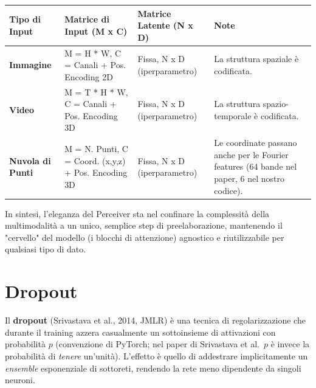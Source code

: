 \documentclass[
  11pt,
]{article}
\newcounter{none} %
\begin{document}
{\def\LTcaptype{none} %
\begin{longtable}{@{}
  >{\raggedright\arraybackslash}p{}
  >{\raggedright\arraybackslash}p{}
  >{\raggedright\arraybackslash}p{}
  >{\raggedright\arraybackslash}p{}@{}}
\toprule\noalign{}
\begin{minipage}[b]{\linewidth}\raggedright
Tipo di Input
\end{minipage} & \begin{minipage}[b]{\linewidth}\raggedright
Matrice di Input (M x C)
\end{minipage} & \begin{minipage}[b]{\linewidth}\raggedright
Matrice Latente (N x D)
\end{minipage} & \begin{minipage}[b]{\linewidth}\raggedright
Note
\end{minipage} \\
\midrule\noalign{}
\endhead
\bottomrule\noalign{}
\endlastfoot
\textbf{Immagine} & M = H * W, C = Canali + Pos. Encoding 2D & Fissa, N
x D (iperparametro) & La struttura spaziale è codificata. \\
\textbf{Video} & M = T * H * W, C = Canali + Pos. Encoding 3D & Fissa, N
x D (iperparametro) & La struttura spazio-temporale è codificata. \\
\textbf{Nuvola di Punti} & M = N. Punti, C = Coord. (x,y,z) + Pos.
Encoding 3D & Fissa, N x D (iperparametro) & Le coordinate passano anche
per le Fourier features (64 bande nel paper, 6 nel nostro codice). \\
\end{longtable}
}

In sintesi, l'eleganza del Perceiver sta nel confinare
la complessità della multimodalità a un unico, semplice step di
preelaborazione, mantenendo il "cervello" del modello (i blocchi di
attenzione) agnostico e riutilizzabile per qualsiasi tipo di dato.


\section{Dropout}
\label{app:dropout}

Il \textbf{dropout} (Srivastava et al., 2014, JMLR) è una tecnica di regolarizzazione che durante il training azzera casualmente un sottoinsieme di attivazioni con probabilità $p$ (convenzione di PyTorch; nel paper di Srivastava et al.\ $p$ è invece la probabilità di \emph{tenere} un'unità). L'effetto è quello di addestrare implicitamente un \emph{ensemble} esponenziale di sottoreti, rendendo la rete meno dipendente da singoli neuroni.
\end{document}
